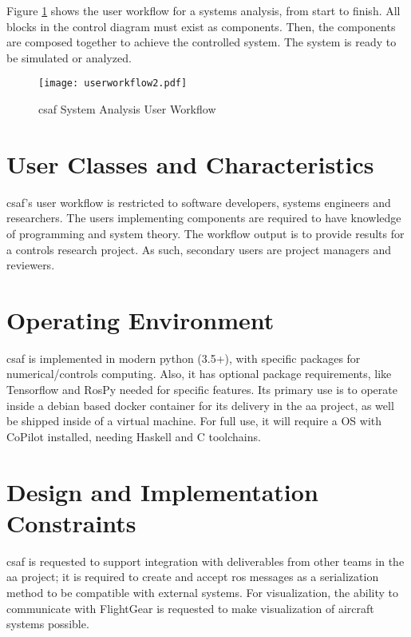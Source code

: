 Figure \ref{fig:uworkflow} shows the user workflow for a systems analysis, from start to finish. All blocks in the control diagram must exist as components. Then, the components are composed together to achieve the controlled system. The system is ready to be simulated or analyzed.

\begin{figure}
\centering
\texttt{[image: userworkflow2.pdf]}
\caption{ \acrshort{csaf} System Analysis User Workflow }
\label{fig:uworkflow}
\end{figure}

\section{User Classes and Characteristics}

\acrshort{csaf}'s user workflow is restricted to software developers, systems engineers and researchers. The users implementing components are required to have knowledge of programming and system theory. The workflow output is to provide results for a controls research project. As such, secondary users are project managers and reviewers. 


\section{Operating Environment}

\acrshort{csaf} is implemented in modern python (3.5+), with specific packages for numerical/controls 
computing. Also, it has optional package requirements, like Tensorflow and RosPy needed for specific 
features. Its primary use is to operate inside a debian based docker container for its delivery in the 
\acrlong{aa} project, as well be shipped inside of a virtual machine. For full use, it will require a OS with 
CoPilot installed, needing Haskell and C toolchains.  

\section{Design and Implementation Constraints}

\acrshort{csaf} is requested to support integration with deliverables from other teams in the \acrshort{aa} 
project; it is required to create and accept \acrshort{ros} messages as a serialization method to be 
compatible with external systems. For visualization, the ability to communicate with FlightGear is requested 
to make visualization of aircraft systems possible. \\

